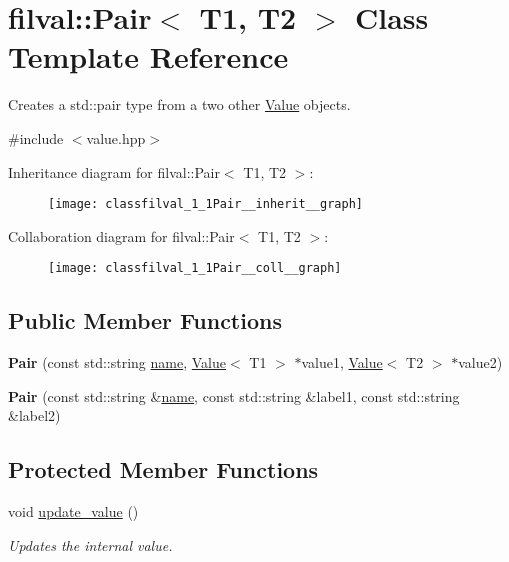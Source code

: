 \hypertarget{classfilval_1_1Pair}{}\section{filval\+:\+:Pair$<$ T1, T2 $>$ Class Template Reference}
\label{classfilval_1_1Pair}


Creates a std\+::pair type from a two other \hyperlink{classfilval_1_1Value}{Value} objects.  




{\ttfamily \#include $<$value.\+hpp$>$}



Inheritance diagram for filval\+:\+:Pair$<$ T1, T2 $>$\+:
\nopagebreak
\begin{figure}[H]
\begin{center}
\leavevmode
\texttt{[image: classfilval\_1\_1Pair\_\_inherit\_\_graph]}
\end{center}
\end{figure}


Collaboration diagram for filval\+:\+:Pair$<$ T1, T2 $>$\+:
\nopagebreak
\begin{figure}[H]
\begin{center}
\leavevmode
\texttt{[image: classfilval\_1\_1Pair\_\_coll\_\_graph]}
\end{center}
\end{figure}
\subsection*{Public Member Functions}
\begin{DoxyCompactItemize}
\item 
\hypertarget{classfilval_1_1Pair_abd85360b5436586d954500d6b45009c2}{}\label{classfilval_1_1Pair_abd85360b5436586d954500d6b45009c2} 
{\bfseries Pair} (const std\+::string \hyperlink{classfilval_1_1GenValue_a007e38c03ee041c2a657afa3d6e91ab1}{name}, \hyperlink{classfilval_1_1Value}{Value}$<$ T1 $>$ $\ast$value1, \hyperlink{classfilval_1_1Value}{Value}$<$ T2 $>$ $\ast$value2)
\item 
\hypertarget{classfilval_1_1Pair_a7da9e34f9f8e1b604b4f1587942ec5c7}{}\label{classfilval_1_1Pair_a7da9e34f9f8e1b604b4f1587942ec5c7} 
{\bfseries Pair} (const std\+::string \&\hyperlink{classfilval_1_1GenValue_a007e38c03ee041c2a657afa3d6e91ab1}{name}, const std\+::string \&label1, const std\+::string \&label2)
\end{DoxyCompactItemize}
\subsection*{Protected Member Functions}
\begin{DoxyCompactItemize}
\item 
void \hyperlink{classfilval_1_1Pair_a1dd5b3859d023821081659cc8a66bda4}{update\+\_\+value} ()
\begin{DoxyCompactList}\small\item\em Updates the internal value. \end{DoxyCompactList}\end{DoxyCompactItemize}
